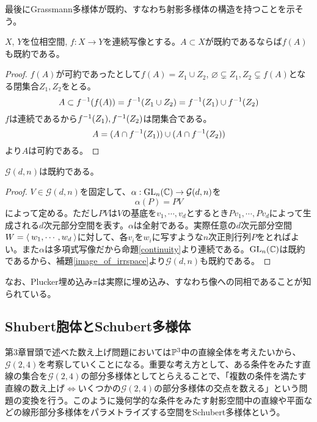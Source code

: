 \documentclass{ltjsreport}
\begin{document}
最後にGrassmann多様体が既約、すなわち射影多様体の構造を持つことを示そう。

\begin{lemm}\label{image_of_irrspace}
  $X$, $Y$を位相空間, $f:X\rightarrow Y$を連続写像とする。$A\subset X$が既約であるならば$f(A)$も既約である。
\end{lemm}

\begin{proof}
  $f(A)$が可約であったとして$f(A)=Z_1\cup Z_2$, $\varnothing\subsetneq Z_1,Z_2\subsetneq f(A)$となる閉集合$Z_1,Z_2$をとる。
  \[
  A\subset f^{-1}(f(A))=f^{-1}(Z_1\cup Z_2)=f^{-1}(Z_1)\cup f^{-1}(Z_2)  
  \]
  $f$は連続であるから$f^{-1}(Z_1), f^{-1}(Z_2)$は閉集合である。
  \[
  A=(A\cap f^{-1}(Z_1))\cup(A\cap f^{-1}(Z_2))
  \]
  より$A$は可約である。
\end{proof}

\begin{prop}
  $\mathcal{G}(d,n)$は既約である。
\end{prop}

\begin{proof}
  $V\in\mathcal{G}(d,n)$を固定して、$\alpha:\text{GL}_n(\mathbb{C})\rightarrow\mathcal{G}(d,n)$を
  \[
  \alpha(P)=PV  
  \]
  によって定める。ただし$PV$は$V$の基底を$v_1,\cdots,v_d$とするとき$Pv_1,\cdots,Pv_d$によって生成される$d$次元部分空間を表す。$\alpha$は全射である。実際任意の$d$次元部分空間$W=\langle\:w_1,\cdots,w_d\:\rangle$に対して、各$v_i$を$w_i$に写すような$n$次正則行列$P$をとればよい。また$\alpha$は多項式写像だから命題\ref{continuity}より連続である。$\text{GL}_n(\mathbb{C})$は既約であるから、補題\ref{image_of_irrspace}より$\mathcal{G}(d,n)$も既約である。
\end{proof}

なお、Plucker埋め込み$\pi$は実際に埋め込み、すなわち像への同相であることが知られている。






\subsection{Shubert胞体とSchubert多様体}

第3章冒頭で述べた数え上げ問題においては$\mathbb{P}^3$中の直線全体を考えたいから、$\mathcal{G}(2,4)$を考察していくことになる。重要な考え方として、ある条件をみたす直線の集合を$\mathcal{G}(2,4)$の部分多様体としてとらえることで、「複数の条件を満たす直線の数え上げ$\Leftrightarrow$いくつかの$\mathcal{G}(2,4)$の部分多様体の交点を数える」という問題の変換を行う。このように幾何学的な条件をみたす射影空間中の直線や平面などの線形部分多様体をパラメトライズする空間をSchubert多様体という。
\end{document}
